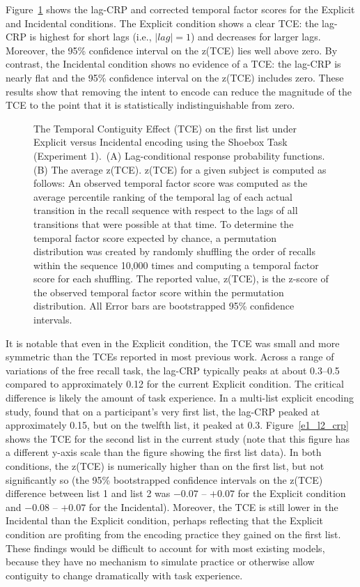 \documentclass[man,natbib,floatsintext]{apa6} %
\begin{document}
Figure~\ref{e1_l1_crp} shows the lag-CRP and corrected temporal factor scores for the Explicit and Incidental conditions. The Explicit condition shows a clear TCE: the lag-CRP is highest for short lags (i.e., $|lag|=1$) and decreases for larger lags. Moreover, the 95\% confidence interval on the z(TCE) lies well above zero. By contrast, the Incidental condition shows no evidence of a TCE: the lag-CRP is nearly flat and the 95\% confidence interval on the z(TCE) includes zero.  These results show that removing the intent to encode can reduce the magnitude of the TCE to the point that it is statistically indistinguishable from zero.

\newcommand\paneltext{~(A) Lag-conditional response probability functions. (B) The average z(TCE). z(TCE) for a given subject is computed as follows: An observed temporal factor score was computed as the average percentile ranking of the temporal lag of each actual transition in the recall sequence with respect to the lags of all transitions that were possible at that time. To determine the temporal factor score expected by chance, a permutation distribution was created by randomly shuffling the order of recalls within the sequence 10,000 times and computing a temporal factor score for each shuffling. The reported value, z(TCE), is the z-score of the observed temporal factor score within the permutation distribution. All Error bars are bootstrapped 95\% confidence intervals.}
\begin{figure}
\caption{The Temporal Contiguity Effect (TCE) on the first list under Explicit versus Incidental encoding using the Shoebox Task (Experiment 1).\paneltext}
\label{e1_l1_crp}
\end{figure}

It is notable that even in the Explicit condition, the TCE was small and more symmetric than the TCEs reported in most previous work. Across a range of variations of the free recall task, the lag-CRP typically peaks at about 0.3--0.5 \citep{HealKaha17} compared to approximately 0.12 for the current Explicit condition. The critical difference is likely the amount of task experience. In a multi-list explicit encoding study, \citet{HealKaha17} found that on a participant's very first list, the lag-CRP peaked at approximately 0.15, but on the twelfth list, it peaked at 0.3. Figure~\ref{e1_l2_crp} shows the TCE for the second list in the current study (note that this figure has a different y-axis scale than the figure showing the first list data). In both conditions, the z(TCE) is numerically higher than on the first list, but not significantly so (the 95\% bootstrapped confidence intervals on the z(TCE) difference between list 1 and list 2 was $-0.07$ -- $+0.07$ for the Explicit condition and $-0.08$ -- $+0.07$ for the Incidental). Moreover, the TCE is still lower in the Incidental than the Explicit condition, perhaps reflecting that the Explicit condition are profiting from the encoding practice they gained on the first list. These findings would be difficult to account for with most existing models, because they have no mechanism to simulate practice or otherwise allow contiguity to change dramatically with task experience.
\end{document}
